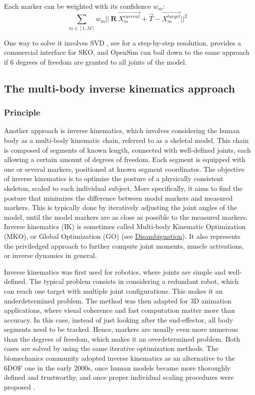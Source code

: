 Each marker can be weighted with its confidence $w_m$:
\begin{equation}\label{eq:weighted_sko}
  \sum_{m \in [1,M]}
  w_m ||\ \textbf{R} \ \overrightarrow{X^{current}_m} + \overrightarrow{T} - \overrightarrow{X^{target}_m} ||^2
\end{equation} 

One way to solve it involves SVD \cite{Arun1987,Soderkvist1993} %
, see \cite{Sorkine2017} for a step-by-step resolution. \cite{Visual3D} provides a commercial interface for SKO, and OpenSim can boil down to the same approach if 6 degrees of freedom are granted to all joints of the model.


\newpage
\subsection{The multi-body inverse kinematics approach}\label{invkin}

\subsubsection{Principle}

Another approach is inverse kinematics, which involves considering the human body as a multi-body kinematic chain, referred to as a skeletal model. This chain is composed of segments of known length, connected with well-defined joints, each allowing a certain amount of degrees of freedom. Each segment is equipped with one or several markers, positioned at known segment coordinates. The objective of inverse kinematics is to optimize the posture of a physically consistent skeleton, scaled to each individual subject. More specifically, it aims to find the posture that minimizes the difference between model markers and measured markers. This is typically done by iteratively adjusting the joint angles of the model, until the model markers are as close as possible to the measured markers. Inverse kinematics (IK) is sometimes called Multi-body Kinematic Optimization (MKO), or Global Optimization (GO) \cite{Begon2018} (see \hyperlink{Ann:gloss}{Disambiguation}). It also represents the priviledged approach to further compute joint moments, muscle activations, or inverse dynamics in general.

Inverse kinematics was first used for robotics, where joints are simple and well-defined. The typical problem consists in considering a redundant robot, which can reach one target with multiple joint configurations. This makes it an underdetermined problem. The method was then adapted for 3D animation applications, where visual coherence and fast computation matter more than accuracy. In this case, instead of just looking after the end-effector, all body segments need to be tracked. Hence, markers are usually even more numerous than the degrees of freedom, which makes it an overdetermined problem. Both cases are solved by using the same iterative optimization methods. The biomechanics community adopted inverse kinematics as an alternative to the 6DOF one in the early 2000s, once human models became more thoroughly defined and trustworthy, and once proper individual scaling procedures were proposed \cite{Hicks2015}.

